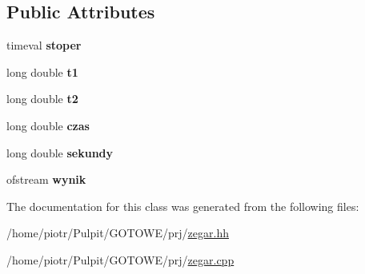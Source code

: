 \subsection*{\-Public \-Attributes}
\begin{DoxyCompactItemize}
\item 
\hypertarget{classzegar_a4c16d3b27f74dc7760b8a23269a20a7b}{timeval {\bfseries stoper}}\label{classzegar_a4c16d3b27f74dc7760b8a23269a20a7b}

\item 
\hypertarget{classzegar_aafb4ae592701809482f334fb0d3e55bf}{long double {\bfseries t1}}\label{classzegar_aafb4ae592701809482f334fb0d3e55bf}

\item 
\hypertarget{classzegar_ac32f1b83ea11b875ba4356afba430581}{long double {\bfseries t2}}\label{classzegar_ac32f1b83ea11b875ba4356afba430581}

\item 
\hypertarget{classzegar_a2249608c9a5286bba25e22a8d607dc5c}{long double {\bfseries czas}}\label{classzegar_a2249608c9a5286bba25e22a8d607dc5c}

\item 
\hypertarget{classzegar_ae51c387a5599badba9221824ae75b1de}{long double {\bfseries sekundy}}\label{classzegar_ae51c387a5599badba9221824ae75b1de}

\item 
\hypertarget{classzegar_ab52ebd6c7d2692754d05935d9b777be9}{ofstream {\bfseries wynik}}\label{classzegar_ab52ebd6c7d2692754d05935d9b777be9}

\end{DoxyCompactItemize}


\-The documentation for this class was generated from the following files\-:\begin{DoxyCompactItemize}
\item 
/home/piotr/\-Pulpit/\-G\-O\-T\-O\-W\-E/prj/\hyperlink{zegar_8hh}{zegar.\-hh}\item 
/home/piotr/\-Pulpit/\-G\-O\-T\-O\-W\-E/prj/\hyperlink{zegar_8cpp}{zegar.\-cpp}\end{DoxyCompactItemize}
